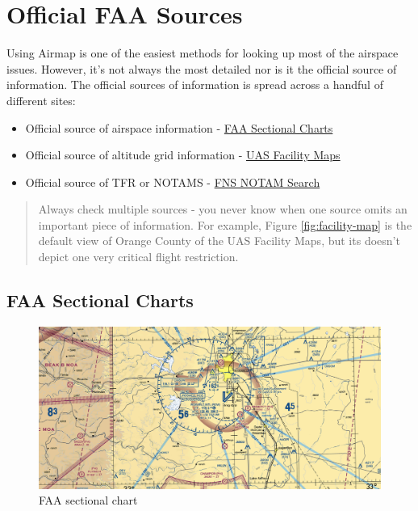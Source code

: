 \documentclass[
]{book}
\providecommand{\tightlist}{%
  \setlength{\itemsep}{0pt}\setlength{\parskip}{0pt}}
\begin{document}
\hypertarget{official-faa-sources}{%
\section{Official FAA Sources}\label{official-faa-sources}}

Using Airmap is one of the easiest methods for looking up most of the airspace issues. However, it's not always the most detailed nor is it the official source of information. The official sources of information is spread across a handful of different sites:

\begin{itemize}
\tightlist
\item
  Official source of airspace information - \href{https://www.faa.gov/air_traffic/flight_info/aeronav/digital_products/vfr/}{FAA Sectional Charts}
\item
  Official source of altitude grid information - \href{https://faa.maps.arcgis.com/apps/webappviewer/index.html?id=9c2e4406710048e19806ebf6a06754ad}{UAS Facility Maps}
\item
  Official source of TFR or NOTAMS - \href{https://notams.aim.faa.gov/notamSearch/nsapp.html\#/}{FNS NOTAM Search}
\end{itemize}

\begin{quote}
Always check multiple sources - you never know when one source omits an important piece of information. For example, Figure \ref{fig:facility-map} is the default view of Orange County of the UAS Facility Maps, but its doesn't depict one very critical flight restriction.
\end{quote}

\hypertarget{faa-sectional-charts}{%
\subsection{FAA Sectional Charts}\label{faa-sectional-charts}}

\begin{figure}
\centering
\includegraphics{images/FAA-VFR.png}
\caption{FAA sectional chart}
\end{figure}
\end{document}
